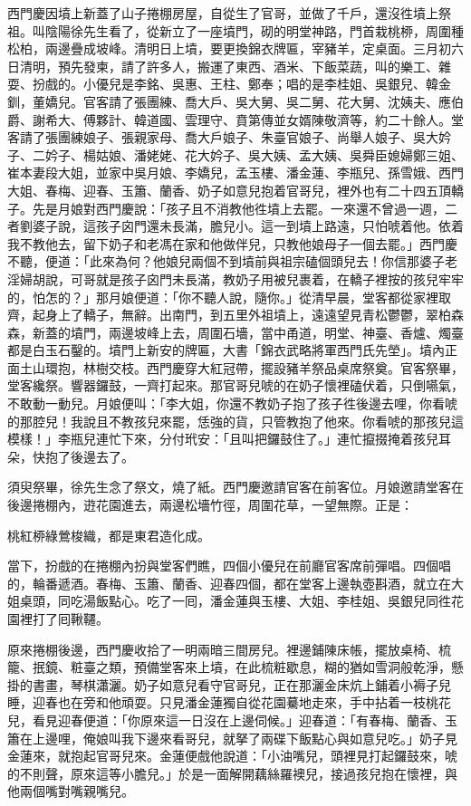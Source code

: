 西門慶因墳上新蓋了山子捲棚房屋，自從生了官哥，並做了千戶，還沒徃墳上祭祖。叫陰陽徐先生看了，從新立了一座墳門，砌的明堂神路，門首栽桃桺，周圍種松柏，兩邊疊成坡峰。清明日上墳，要更換錦衣牌匾，宰豬羊，定桌面。三月初六日清明，預先發柬，請了許多人，搬運了東西、酒米、下飯菜蔬，叫的樂工、雜耍、扮戲的。小優兒是李銘、吳惠、王柱、鄭奉；唱的是李桂姐、吳銀兒、韓金釧，董嬌兒。官客請了張團練、喬大戶、吳大舅、吳二舅、花大舅、沈姨夫、應伯爵、謝希大、傅夥計、韓道國、雲理守、賁第傳並女婿陳敬濟等，約二十餘人。堂客請了張團練娘子、張親家母、喬大戶娘子、朱臺官娘子、尚舉人娘子、吳大妗子、二妗子、楊姑娘、潘姥姥、花大妗子、吳大姨、孟大姨、吳舜臣媳婦鄭三姐、崔本妻段大姐，並家中吳月娘、李嬌兒，孟玉樓、潘金蓮、李瓶兒、孫雪娥、西門大姐、春梅、迎春、玉簫、蘭香、奶子如意兒抱着官哥兒，裡外也有二十四五頂轎子。先是月娘對西門慶說：「孩子且不消教他徃墳上去罷。一來還不曾過一週，二者劉婆子說，這孩子囟門還未長滿，膽兒小。這一到墳上路遠，只怕唬着他。{}依着我不教他去，留下奶子和老馮在家和他做伴兒，只教他娘母子一個去罷。」西門慶不聽，便道：「此來為何？他娘兒兩個不到墳前與祖宗磕個頭兒去！你信那婆子老淫婦胡說，可哥就是孩子囟門未長滿，教奶子用被兒裹着，在轎子裡按的孩兒牢牢的，怕怎的？」那月娘便道：「你不聽人說，隨你。」從清早晨，堂客都從家裡取齊，起身上了轎子，無辭。出南門，到五里外祖墳上，遠遠望見青松鬱鬱，翠柏森森，新蓋的墳門，兩邊坡峰上去，周圍石墻，當中甬道，明堂、神臺、香爐、燭臺都是白玉石鑿的。墳門上新安的牌匾，大書「錦衣武略將軍西門氏先塋」。墳內正面土山環抱，林樹交枝。西門慶穿大紅冠帶，擺設豬羊祭品桌席祭奠。官客祭畢，堂客纔祭。響器鑼鼓，一齊打起來。那官哥兒唬的在奶子懷裡磕伏着，只倒嚥氣，不敢動一動兒。月娘便叫：「李大姐，你還不教奶子抱了孩子徃後邊去哩，你看唬的那腔兒！{}我說且不教孩兒來罷，恁強的貨，只管教抱了他來。你看唬的那孩兒這模樣！」李瓶兒連忙下來，分付玳安：「且叫把鑼鼓住了。」連忙攛掇掩着孩兒耳朵，快抱了後邊去了。

須臾祭畢，徐先生念了祭文，燒了紙。西門慶邀請官客在前客位。月娘邀請堂客在後邊捲棚內，逰花園進去，兩邊松墻竹徑，周圍花草，一望無際。正是：

桃紅桺綠鶯梭織，都是東君造化成。

當下，扮戲的在捲棚內扮與堂客們瞧，四個小優兒在前廳官客席前彈唱。四個唱的，輪番遞酒。春梅、玉簫、蘭香、迎春四個，都在堂客上邊執壺斟酒，就立在大姐桌頭，同吃湯飯點心。吃了一囘，潘金蓮與玉樓、大姐、李桂姐、吳銀兒同徃花園裡打了囘鞦韆。

原來捲棚後邊，西門慶收拾了一明兩暗三間房兒。裡邊鋪陳床帳，擺放桌椅、梳籠、抿鏡、粧臺之類，預備堂客來上墳，在此梳粧歇息，糊的猶如雪洞般乾淨，懸掛的書畫，琴棋瀟灑。奶子如意兒看守官哥兒，正在那灑金床炕上鋪着小褥子兒睡，迎春也在旁和他頑耍。只見潘金蓮獨自從花園驀地走來，手中拈着一枝桃花兒，{}看見迎春便道：「你原來這一日沒在上邊伺候。」迎春道：「有春梅、蘭香、玉簫在上邊哩，俺娘叫我下邊來看哥兒，就拏了兩碟下飯點心與如意兒吃。」奶子見金蓮來，就抱起官哥兒來。金蓮便戲他說道：「小油嘴兒，頭裡見打起鑼鼓來，唬的不則聲，原來這等小膽兒。」於是一面解開藕絲羅襖兒，接過孩兒抱在懷裡，與他兩個嘴對嘴親嘴兒。

